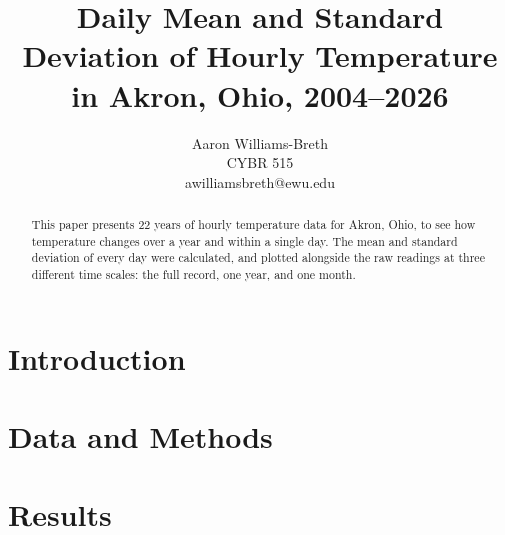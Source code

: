 \documentclass[letterpaper,twocolumn,10pt]{article}
\begin{document}

\date{}

\title{\Large \bf Daily Mean and Standard Deviation of Hourly Temperature\\
  in Akron, Ohio, 2004--2026}

\author{
{\rm Aaron Williams-Breth}\\
CYBR 515\\
awilliamsbreth@ewu.edu
} %

\maketitle

\begin{abstract}
This paper presents 22 years of hourly temperature data for
Akron, Ohio, to see how temperature changes over a year and within a
single day. The mean and standard deviation of every day were calculated,
and plotted alongside the raw readings at three different time scales: the
full record, one year, and one month.
\end{abstract}


\section{Introduction}


\section{Data and Methods}


\section{Results}





\end{document}
